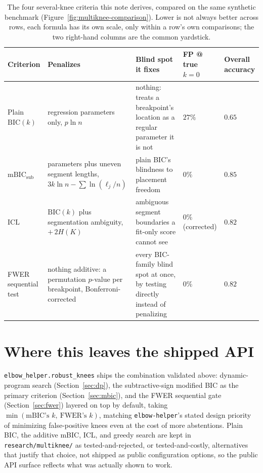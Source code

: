 \documentclass[11pt]{article}
\newcommand{\code}[1]{\texttt{#1}}
\begin{document}
\begin{table}[H]
\centering
\footnotesize
\begin{tabular}{@{}p{2.1cm}p{2.9cm}p{3.6cm}p{1.6cm}p{1.6cm}@{}}
\toprule
Criterion & Penalizes & Blind spot it fixes & FP @ true $k{=}0$ & Overall accuracy \\
\midrule
Plain $\mathrm{BIC}(k)$ & regression parameters only, $p\ln n$ &
  nothing: treats a breakpoint's location as a regular parameter it
  is not & $27\%$ & $0.65$ \\
$\mathrm{mBIC}_{\text{sub}}$ & parameters plus uneven segment
  lengths, $3k\ln n - \sum\ln(\ell_j/n)$ &
  plain BIC's blindness to placement freedom & $0\%$ & $0.85$ \\
$\mathrm{ICL}$ & $\mathrm{BIC}(k)$ plus segmentation ambiguity,
  $+\,2H(K)$ &
  ambiguous segment boundaries a fit-only score cannot see & $0\%$
  (corrected) & $0.82$ \\
FWER sequential test & nothing additive: a permutation $p$-value per
  breakpoint, Bonferroni-corrected & every BIC-family blind spot at
  once, by testing directly instead of penalizing & $0\%$ & $0.82$ \\
\bottomrule
\end{tabular}
\caption{The four several-knee criteria this note derives, compared on
the same synthetic benchmark (Figure~\ref{fig:multiknee-comparison}).
Lower is not always better across rows, each formula has its own
scale, only within a row's own comparisons; the two right-hand columns
are the common yardstick.}
\label{tab:criteria}
\end{table}

\section{Where this leaves the shipped API}

\code{elbow\_helper.robust\_knees} ships the combination validated
above: dynamic-program search (Section~\ref{sec:dp}), the subtractive-sign
modified BIC as the primary criterion (Section~\ref{sec:mbic}), and the FWER
sequential gate (Section~\ref{sec:fwer}) layered on top by default, taking
$\min(\text{mBIC's } k,\ \text{FWER's } k)$, matching \code{elbow-helper}'s
stated design priority of minimizing false-positive knees even at the cost
of more abstentions. Plain BIC, the additive mBIC, ICL, and greedy search
are kept in \code{research/multiknee/} as tested-and-rejected, or
tested-and-costly, alternatives that justify that choice, not shipped as
public configuration options, so the public API surface reflects what was
actually shown to work.
\end{document}
